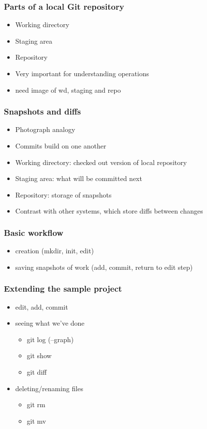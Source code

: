\documentclass{git_course}
\begin{document}
\begin{frame}
\frametitle{Parts of a local Git repository}
\begin{itemize}
    \item Working directory
    \item Staging area
    \item Repository
    \item Very important for understanding operations
    \item need image of wd, staging and repo
\end{itemize}
\end{frame}

\begin{frame}
\frametitle{Snapshots and diffs}
\begin{itemize}
    \item Photograph analogy
    \item Commits build on one another
    \item Working directory: checked out version of local repository
    \item Staging area: what will be committed next
    \item Repository: storage of snapshots
    \item Contrast with other systems, which store diffs between changes
\end{itemize}
\end{frame}

\begin{frame}
\frametitle{Basic workflow}
\begin{itemize}
    \item creation (mkdir, init, edit)
    \item saving snapshots of work (add, commit, return to edit step)
\end{itemize}
\end{frame}

\begin{frame}
\frametitle{Extending the sample project}
\begin{itemize}
    \item edit, add, commit
    \item seeing what we've done
    \begin{itemize}
        \item git log (--graph)
        \item git show
        \item git diff
    \end{itemize}
    \item deleting/renaming files
    \begin{itemize}
        \item git rm
        \item git mv
    \end{itemize}
\end{itemize}
\end{frame}
\end{document}
